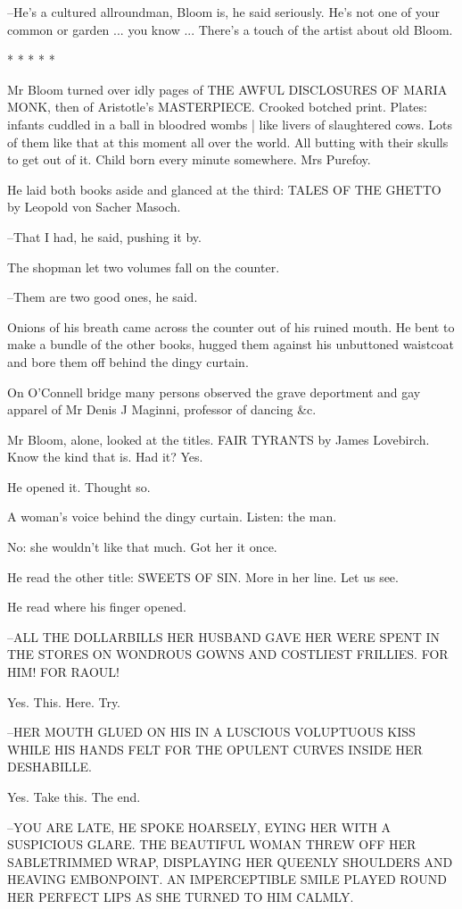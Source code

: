 --He's a cultured allroundman, Bloom is, he said seriously. He's not one
of your common or garden ... you know ... There's a touch of the artist
about old Bloom.


    * * * * *


Mr Bloom turned over idly pages of THE AWFUL DISCLOSURES OF MARIA MONK,
then of Aristotle's MASTERPIECE.
Crooked botched print.
Plates:
infants cuddled in a ball in bloodred wombs |
like livers of slaughtered cows.
Lots of them like that at this moment all over the world.
All butting with their skulls to get out of it.
Child born every minute
somewhere.
Mrs Purefoy.%

He laid both books aside and glanced at the third:
TALES OF THE GHETTO
by Leopold von Sacher Masoch.

--That I had, he said, pushing it by.

The shopman let two volumes fall on the counter.

--Them are two good ones, he said.

Onions of his breath came across the counter out of his ruined
mouth. He bent to make a bundle of the other books, hugged them against
his unbuttoned waistcoat and bore them off behind the dingy curtain.

On O'Connell bridge many persons observed the grave deportment
and gay apparel of Mr Denis J Maginni,
professor of dancing \&c.

Mr Bloom, alone, looked at the titles. FAIR TYRANTS by James Lovebirch.
Know the kind that is. Had it? Yes.

He opened it. Thought so.

A woman's voice behind the dingy curtain. Listen: the man.

No: she wouldn't like that much. Got her it once.

He read the other title: SWEETS OF SIN. More in her line. Let us see.

He read where his finger opened.

--ALL THE DOLLARBILLS HER HUSBAND GAVE HER WERE SPENT IN THE STORES ON
WONDROUS GOWNS AND COSTLIEST FRILLIES. FOR HIM! FOR RAOUL!

Yes. This.
Here. Try.

--HER MOUTH GLUED ON HIS IN A LUSCIOUS VOLUPTUOUS KISS WHILE HIS HANDS
FELT FOR THE OPULENT CURVES INSIDE HER DESHABILLE.

Yes. Take this. The end.

--YOU ARE LATE, HE SPOKE HOARSELY, EYING HER WITH A SUSPICIOUS GLARE.
THE BEAUTIFUL WOMAN THREW OFF HER SABLETRIMMED WRAP, DISPLAYING HER
QUEENLY SHOULDERS AND HEAVING EMBONPOINT. AN IMPERCEPTIBLE SMILE PLAYED
ROUND HER PERFECT LIPS AS SHE TURNED TO HIM CALMLY.

